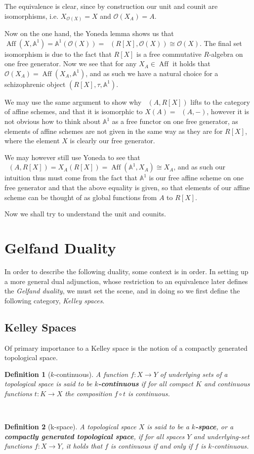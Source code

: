 \documentclass[12pt,a4paper]{article}
\newtheorem{definition}{Definition}[section] %
\DeclareMathOperator{\CAlg}{CAlg_R}
\DeclareMathOperator{\Aff}{Aff}
\begin{document}
The equivalence is clear, since by construction  our unit and counit are  isomorphisms, i.e. $X_{\mathcal{O}(X)} =X$ and $\mathcal{O}(X_A) = A$. 


Now on the one hand,  the Yoneda lemma shows us that   $\Aff(X, \mathbb{A}^1) = \mathbb{A}^1(\mathcal{O}(X)) = \CAlg(R[X], \mathcal{O}(X)) \cong \mathcal{O}(X)$. The final set isomorphism is due to the fact that $R[X]$ is a free commutative $R$-algebra on one free generator. Now we see that for any $X_A \in \Aff$ it holds that $\mathcal{O}(X_A) = \Aff(X_A, \mathbb{A}^1)$, and as such we have a natural choice for a schizophrenic object $(R[X], \tau, \mathbb{A}^1 )$. 


We may use the same argument to show why $\CAlg(A, R[X])$ lifts to the category of affine schemes, and that it is isomorphic to $X(A) = \CAlg(A, -)$, however it is not obvious how to think about $\mathbb{A}^1$ as a free functor on one free generator, as elements of affine schemes are not given in the same way as they are for $R[X]$, where the element $X$ is clearly our free generator. 

We may however still use Yoneda to see that $\CAlg(A, R[X]) = X_A(R[X]) = \Aff(\mathbb{A}^1, X_A) \cong X_A$, and as such our intuition thus must come from the fact that $\mathbb{A}^1$ is our free affine scheme on one free generator and that the above equality is given, so that elements of our affine scheme can be thought of as global functions from $A$ to $R[X]$. 

Now we shall try to understand the unit and counits.

\section{Gelfand Duality}
In order to describe the following duality, some context is in order. In setting up a more general dual adjunction, whose restriction to an equivalence later defines the \emph{Gelfand duality}, we must set the scene, and in doing so we first define the following category, \emph{Kelley spaces}.
\subsection{Kelley Spaces}
Of primary importance to a Kelley space is the notion of a compactly generated topological space.
\\
\begin{definition}[$k$-continuous]
	A function $f: X \to Y$ of underlying sets of a topological space is said to be \textbf{$k$-continuous} if for all compact $K$ and continuous functions $t: K \to X$ the composition $f \circ t$ is continuous. 
\end{definition}
\
\begin{definition}[k-space]
A topological space $X$ is said to be a \textbf{$k$-space}, or a \textbf{compactly generated topological space}, if for all spaces $Y$ and underlying-set functions $f: X \to Y$, it holds that $f$ is continuous if and only if $f$ is $k$-continuous.	
\end{definition}
\
\end{document}
